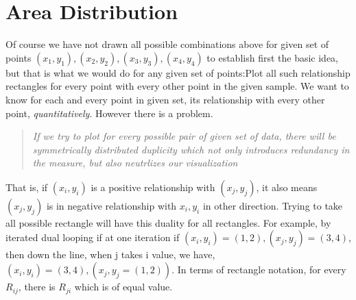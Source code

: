\documentclass[float=false,crop=false]{standalone}
\begin{document}
    \section{Area Distribution}\label{area-distribution}

Of course we have not drawn all possible combinations above for given
set of points \((x_1,y_1), (x_2, y_2), (x_3, y_3), (x_4,y_4)\) to
establish first the basic idea, but that is what we would do for any
given set of points:Plot all such relationship rectangles for every
point with every other point in the given sample. We want to know for
each and every point in given set, its relationship with every other
point, \emph{quantitatively}. However there is a problem.

    \begin{quote}
\emph{If we try to plot for every possible pair of given set of data,
there will be symmetrically distributed duplicity which not only
introduces redundancy in the measure, but also neutrlizes our
visualization}
\end{quote}

    That is, if \((x_i,y_i)\) is a positive relationship with \((x_j,y_j)\),
it also means \((x_j,y_j)\) is in negative relationship with
\(x_i, y_i\) in other direction. Trying to take all possible rectangle
will have this duality for all rectangles. For example, by iterated dual
looping if at one iteration if \((x_i,y_i) = (1,2), (x_j,y_j) = (3,4)\),
then down the line, when j takes i value, we have,
\((x_i,y_i) = (3,4), (x_j,y_j = (1,2))\). In terms of rectangle
notation, for every \(R_{ij}\), there is \(R_{ji}\) which is of equal
value.
    \begin{center}
    \end{center}
    { \hspace*{\fill} \\}
    
\end{document}
